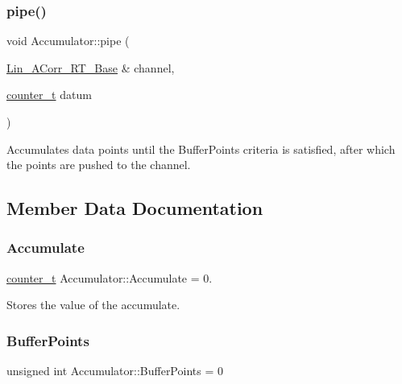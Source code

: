 \subsubsection{\texorpdfstring{pipe()}{pipe()}}
{\footnotesize\ttfamily void Accumulator\+::pipe (\begin{DoxyParamCaption}\item[{\hyperlink{classLin__ACorr__RT__Base}{Lin\+\_\+\+A\+Corr\+\_\+\+R\+T\+\_\+\+Base} \&}]{channel,  }\item[{\hyperlink{types_8hpp_a22f279793847eba127de149437848c48}{counter\+\_\+t}}]{datum }\end{DoxyParamCaption})\hspace{0.3cm}{\ttfamily [inline]}}



Accumulates data points until the Buffer\+Points criteria is satisfied, after which the points are pushed to the channel. 



\subsection{Member Data Documentation}
\mbox{\label{classAccumulator_a8e615af8b85dd2c8500d1f8c473879ab}} 
\subsubsection{\texorpdfstring{Accumulate}{Accumulate}}
{\footnotesize\ttfamily \hyperlink{types_8hpp_a22f279793847eba127de149437848c48}{counter\+\_\+t} Accumulator\+::\+Accumulate = 0.\hspace{0.3cm}{\ttfamily [private]}}



Stores the value of the accumulate. 

\mbox{\label{classAccumulator_a559e4fac031df015e47248599740b33c}} 
\subsubsection{\texorpdfstring{Buffer\+Points}{BufferPoints}}
{\footnotesize\ttfamily unsigned int Accumulator\+::\+Buffer\+Points = 0\hspace{0.3cm}{\ttfamily [private]}}



